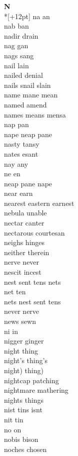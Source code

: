 \vspace{14pt}
\noindent\textbf{\Large N}\\*[+12pt]
na an\\
nab ban\\
nadir drain\\
nag gan\\
nags sang\\
nail lain\\
nailed denial\\
nails snail slain\\
name mane mean\\
named amend\\
names means mensa\\
nap pan\\
nape neap pane\\
nasty tansy\\
nates esant\\
nay any\\
ne en\\
neap pane nape\\
near earn\\
nearest eastern earnest\\
nebula unable\\
nectar canter\\
nectarous courtesan\\
neighs hinges\\
neither therein\\
nerve never\\
nescit incest\\
nest sent tens nets\\
net ten\\
nets nest sent tens\\
never nerve\\
news sewn\\
ni in\\
nigger ginger\\
night thing\\
night's thing's\\
night) thing)\\
nightcap patching\\
nightmare mathering\\
nights things\\
nist tins isnt\\
nit tin\\
no on\\
nobis bison\\
noches chosen\\
